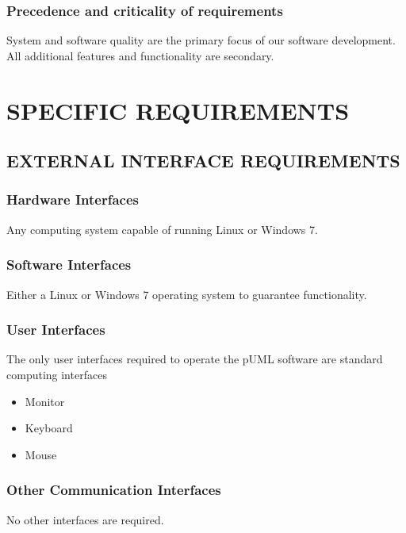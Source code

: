 \documentclass[twoside,letterpaper]{article}
\begin{document}
\subsubsection[Precedence and criticality of requirements]{\bfseries
Precedence and criticality of requirements}
{
System and software quality are the primary focus of our software development. All additional features and functionality are secondary. 
}












\clearpage\section[SPECIFIC REQUIREMENTS]{\bfseries
SPECIFIC REQUIREMENTS}

\subsection[EXTERNAL INTERFACE REQUIREMENTS]{\bfseries
EXTERNAL INTERFACE REQUIREMENTS}

\subsubsection[Hardware Interfaces]{\bfseries
Hardware Interfaces}
{

{
Any computing system capable of running Linux or Windows 7.}}

\subsubsection[Software Interfaces]{\bfseries
Software Interfaces}
{ 
{
Either a Linux or Windows 7 operating system to guarantee functionality.
}}

\subsubsection[User Interfaces]{\bfseries
User Interfaces}
{
The only user interfaces required to operate the pUML software are standard computing interfaces
\begin{itemize}
  \item Monitor
  \item Keyboard
  \item Mouse
\end{itemize}
}

\subsubsection[Other Communication
Interfaces]{\bfseries
Other Communication Interfaces}
{
{No other interfaces are required. }}
\end{document}
